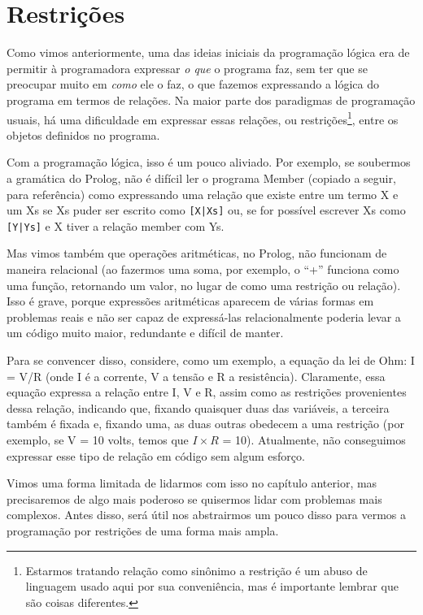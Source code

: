 \documentclass{article}
\theoremstyle{remark}
\theoremstyle{theorem}
\begin{document}
\section{Restrições}

Como vimos anteriormente, uma das ideias iniciais da programação lógica era de permitir à programadora expressar \textit{o que} o programa faz, sem ter que se preocupar muito em \textit{como} ele o faz, o que fazemos expressando a lógica do programa em termos de relações. Na maior parte dos paradigmas de programação usuais, há uma dificuldade em expressar essas relações, ou restrições\footnote{Estarmos tratando relação como sinônimo a restrição é um abuso de linguagem usado aqui por sua conveniência, mas é importante lembrar que são coisas diferentes.}, entre os objetos definidos no programa.

Com a programação lógica, isso é um pouco aliviado. Por exemplo, se soubermos a gramática do Prolog, não é difícil ler o programa Member (copiado a seguir, para referência) como expressando uma relação que existe entre um termo X e um Xs se Xs puder ser escrito como {\tt[X|Xs]}
ou, se for possível escrever Xs como {\tt [Y|Ys]} e X tiver a relação member com Ys.



Mas vimos também que operações aritméticas, no Prolog, não funcionam de maneira relacional (ao fazermos uma soma, por exemplo, o ``+'' funciona como uma função, retornando um valor, no lugar de como uma restrição ou relação). Isso é grave, porque expressões aritméticas aparecem de várias formas em problemas reais e não ser capaz de expressá-las relacionalmente poderia levar a um código muito maior, redundante e difícil de manter.

Para se convencer disso, considere, como um exemplo, a equação da lei de Ohm: I = V/R (onde I é a
corrente, V a tensão e R a resistência).
Claramente, essa equação expressa a relação entre I, V e R, assim como as restrições provenientes dessa relação, indicando que, fixando quaisquer duas das variáveis, a terceira também é fixada e, fixando uma, as duas outras obedecem a uma restrição (por exemplo, se V = 10 volts, temos que $I \times R$ = 10). Atualmente, não conseguimos expressar esse tipo de relação em código sem algum esforço.

Vimos uma forma limitada de lidarmos com isso no capítulo anterior, %
mas precisaremos de algo mais poderoso se quisermos lidar com problemas mais complexos. Antes disso, será útil nos abstrairmos um pouco disso para vermos a programação por restrições de uma forma mais ampla.
\end{document}

